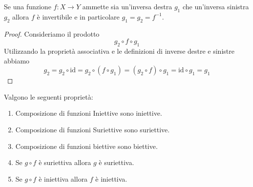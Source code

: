 \documentclass[11pt]{scrartcl}
\begin{document}
	\begin{proposition}[Invertibile a dx + invertibile a sx = invertibile]
		Se una funzione $f:X\to Y$ ammette sia un'inversa destra $g_1$ che un'inversa sinistra $g_2$ allora $f$ è invertibile e in particolare $g_1=g_2=f^{-1}$.
	\end{proposition}
	
	\begin{proof}
		Consideriamo il prodotto
		$$g_2\circ f \circ g_1$$
		Utilizzando la proprietà associativa e le definizioni di inverse destre e sinistre abbiamo
		$$g_2=g_2\circ \text{id}=g_2\circ (f\circ g_1)=(g_2\circ f)\circ g_1=\text{id}\circ g_1=g_1$$
	\end{proof}
	
	\begin{lemma}
		\label{compfunc}
		Valgono le seguenti proprietà:
		\begin{enumerate}
			\item Composizione di funzioni Iniettive sono iniettive.
			\item Composizione di funzioni Suriettive sono suriettive.
			\item Composizione di funzioni biettive sono biettive.
			\item Se $g\circ f$ è suriettiva allora $g$ è suriettiva.
			\item Se $g\circ f$ è iniettiva allora $f$ è iniettiva.
		\end{enumerate}
	\end{lemma}
	
\end{document}
